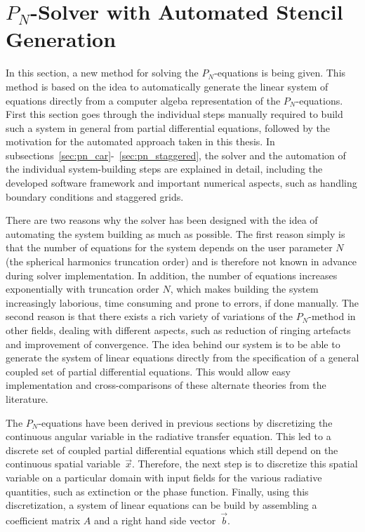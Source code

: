 \section{$P_N$-Solver with Automated Stencil Generation}
\label{sec:pn_solver}

In this section, a new method for solving the $P_N$-equations is being given. This method is based on the idea to automatically generate the linear system of equations directly from a computer algeba representation of the $P_N$-equations. First this section goes through the individual steps manually required to build such a system in general from partial differential equations, followed by the motivation for the automated approach taken in this thesis. In subsections~\ref{sec:pn_car}-~\ref{sec:pn_staggered}, the solver and the automation of the individual system-building steps are explained in detail, including the developed software framework and important numerical aspects, such as handling boundary conditions and staggered grids.

There are two reasons why the solver has been designed with the idea of automating the system building as much as possible. The first reason simply is that the number of equations for the system depends on the user parameter $N$ (the spherical harmonics truncation order) and is therefore not known in advance during solver implementation. In addition, the number of equations increases exponentially with truncation order $N$, which makes building the system increasingly laborious, time consuming and prone to errors, if done manually. The second reason is that there exists a rich variety of variations of the $P_N$-method in other fields, dealing with different aspects, such as reduction of ringing artefacts and improvement of convergence. The idea behind our system is to be able to generate the system of linear equations directly from the specification of a general coupled set of partial differential equations. This would allow easy implementation and cross-comparisons of these alternate theories from the literature.

The $P_N$-equations have been derived in previous sections by discretizing the continuous angular variable in the radiative transfer equation. This led to a discrete set of coupled partial differential equations which still depend on the continuous spatial variable~$\vec{x}$. Therefore, the next step is to discretize this spatial variable on a particular domain with input fields for the various radiative quantities, such as extinction or the phase function. Finally, using this discretization, a system of linear equations can be build by assembling a coefficient matrix $A$ and a right hand side vector~$\vec{b}$.

